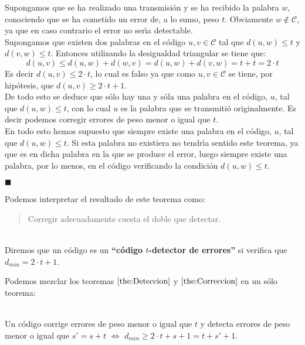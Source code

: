 Supongamos que se ha realizado una transmisi\'on y se ha recibido la palabra
$w$, conociendo que se ha cometido un error de, a lo sumo, peso $t$. Obviamente
$w\notin \mathcal{C}$, ya que en caso contrario el error no ser\'{\i}a
detectable.\\

Supongamos que existen dos palabras en el c\'odigo $u,v\in \mathcal{C}$ tal que
$d(u,w)\leq t$ y $d(v,w)\leq t$. Entonces utilizando la desigualdad triangular
se tiene que:
\begin{displaymath}
d(u,v)\leq d(u,w)+d(w,v) = d(u,w)+d(v,w) = t+t= 2\cdot t
\end{displaymath}
Es decir $d(u,v)\leq 2\cdot t$, lo cual es falso ya que como
$u,v\in \mathcal{C}$ se tiene, por hip\'otesis, que $d(u,v)\geq 2\cdot t + 1$.\\

De todo esto se deduce que s\'olo hay una y s\'ola una palabra en el c\'odigo,
$u$, tal que $d(u,w)\leq t$, con lo cual $u$ es la palabra que se transmiti\'o
originalmente. Es decir podemos corregir errores de peso menor o igual que $t$.\\

En todo esto hemos supuesto que siempre existe una palabra en el c\'odigo, $u$,
tal que $d(u,w)\leq t$. Si esta palabra no existiera no tendr\'{\i}a sentido
este teorema, ya que es en dicha palabra en la que se produce el error, luego
siempre existe una palabra, por lo menos, en el c\'odigo verificando la
condici\'on $d(u,w)\leq t$.
\begin{flushright}
$\blacksquare$
\end{flushright}
Podemos interpretar el resultado de este teorema como:
\begin{quote}
Corregir adecuadamente cuesta el doble que detectar.
\end{quote}
\begin{definicion}
\ \\
Diremos que un c\'odigo es un \textbf{``c\'odigo $t$-detector de errores''} si
verifica que $d_{min}=2\cdot t +1$.
\end{definicion}
Podemos mezclar los teoremas $\ref{the:Deteccion}$ y $\ref{the:Correccion}$ en
un s\'olo teorema:
\begin{teorema}\label{the:DeteccionCorreccion}
\ \\
Un c\'odigo corrige errores de peso menor o igual que $t$ y detecta errores de
peso menor o igual que $s'=s+t$ $\Longleftrightarrow$
$d_{min}\geq 2\cdot t+s+1=t+s'+1$.
\end{teorema}
